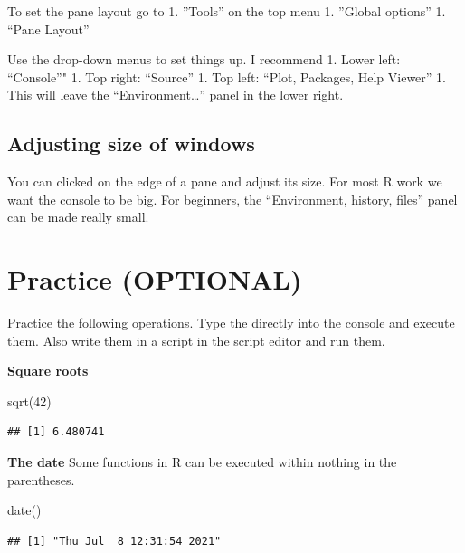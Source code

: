\documentclass[
]{book}
\newenvironment{Shaded}{\begin{snugshade}}{\end{snugshade}}
\newcommand{\DecValTok}[1]{\textcolor[rgb]{0.00,0.00,0.81}{#1}}
\newcommand{\FunctionTok}[1]{\textcolor[rgb]{0.00,0.00,0.00}{#1}}
\newcommand{\NormalTok}[1]{#1}
\begin{document}
To set the pane layout go to
1. ''Tools'' on the top menu
1. ''Global options''
1. ``Pane Layout''

Use the drop-down menus to set things up. I recommend
1. Lower left: ``Console''"
1. Top right: ``Source''
1. Top left: ``Plot, Packages, Help Viewer''
1. This will leave the ``Environment\ldots{}'' panel in the lower right.

\hypertarget{adjusting-size-of-windows}{%
\subsection{Adjusting size of windows}\label{adjusting-size-of-windows}}

You can clicked on the edge of a pane and adjust its size. For most R work we want the console to be big. For beginners, the ``Environment, history, files'' panel can be made really small.

\hypertarget{practice-optional}{%
\section{Practice (OPTIONAL)}\label{practice-optional}}

Practice the following operations. Type the directly into the console and execute them. Also write them in a script in the script editor and run them.

\textbf{Square roots}

\begin{Shaded}
\begin{Highlighting}[]
\FunctionTok{sqrt}\NormalTok{(}\DecValTok{42}\NormalTok{)}
\end{Highlighting}
\end{Shaded}

\begin{verbatim}
## [1] 6.480741
\end{verbatim}

\textbf{The date}
Some functions in R can be executed within nothing in the parentheses.

\begin{Shaded}
\begin{Highlighting}[]
\FunctionTok{date}\NormalTok{()}
\end{Highlighting}
\end{Shaded}

\begin{verbatim}
## [1] "Thu Jul  8 12:31:54 2021"
\end{verbatim}
\end{document}

